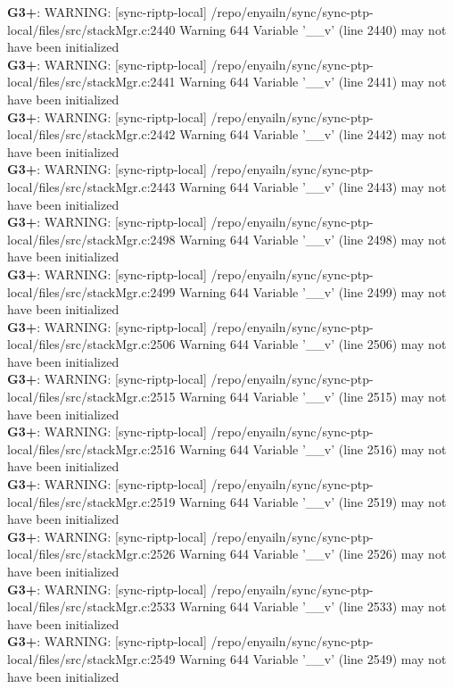 \documentclass[12pt,twoside]{article}
\begin{document}
\textbf{G3+}: WARNING: [sync-riptp-local] /repo/enyailn/sync/sync-ptp-local/files/src/stackMgr.c:2440 Warning 644 Variable '\_\_v' (line 2440) may not have been initialized\\ 
\textbf{G3+}: WARNING: [sync-riptp-local] /repo/enyailn/sync/sync-ptp-local/files/src/stackMgr.c:2441 Warning 644 Variable '\_\_v' (line 2441) may not have been initialized\\ 
\textbf{G3+}: WARNING: [sync-riptp-local] /repo/enyailn/sync/sync-ptp-local/files/src/stackMgr.c:2442 Warning 644 Variable '\_\_v' (line 2442) may not have been initialized\\ 
\textbf{G3+}: WARNING: [sync-riptp-local] /repo/enyailn/sync/sync-ptp-local/files/src/stackMgr.c:2443 Warning 644 Variable '\_\_v' (line 2443) may not have been initialized\\ 
\textbf{G3+}: WARNING: [sync-riptp-local] /repo/enyailn/sync/sync-ptp-local/files/src/stackMgr.c:2498 Warning 644 Variable '\_\_v' (line 2498) may not have been initialized\\ 
\textbf{G3+}: WARNING: [sync-riptp-local] /repo/enyailn/sync/sync-ptp-local/files/src/stackMgr.c:2499 Warning 644 Variable '\_\_v' (line 2499) may not have been initialized\\ 
\textbf{G3+}: WARNING: [sync-riptp-local] /repo/enyailn/sync/sync-ptp-local/files/src/stackMgr.c:2506 Warning 644 Variable '\_\_v' (line 2506) may not have been initialized\\ 
\textbf{G3+}: WARNING: [sync-riptp-local] /repo/enyailn/sync/sync-ptp-local/files/src/stackMgr.c:2515 Warning 644 Variable '\_\_v' (line 2515) may not have been initialized\\ 
\textbf{G3+}: WARNING: [sync-riptp-local] /repo/enyailn/sync/sync-ptp-local/files/src/stackMgr.c:2516 Warning 644 Variable '\_\_v' (line 2516) may not have been initialized\\ 
\textbf{G3+}: WARNING: [sync-riptp-local] /repo/enyailn/sync/sync-ptp-local/files/src/stackMgr.c:2519 Warning 644 Variable '\_\_v' (line 2519) may not have been initialized\\ 
\textbf{G3+}: WARNING: [sync-riptp-local] /repo/enyailn/sync/sync-ptp-local/files/src/stackMgr.c:2526 Warning 644 Variable '\_\_v' (line 2526) may not have been initialized\\ 
\textbf{G3+}: WARNING: [sync-riptp-local] /repo/enyailn/sync/sync-ptp-local/files/src/stackMgr.c:2533 Warning 644 Variable '\_\_v' (line 2533) may not have been initialized\\ 
\textbf{G3+}: WARNING: [sync-riptp-local] /repo/enyailn/sync/sync-ptp-local/files/src/stackMgr.c:2549 Warning 644 Variable '\_\_v' (line 2549) may not have been initialized\\ 
\end{document}

